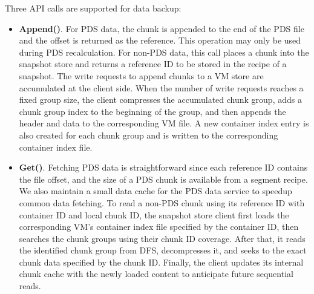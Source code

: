 Three API calls are supported for data backup:
\begin{itemize}

\item
\noindent\textbf{Append()}. 
For PDS data, the chunk is appended to the end of the PDS file and the offset is returned as the  reference.
This operation  may only be used during PDS recalculation.
For non-PDS data, this call places a chunk into 
the snapshot store and returns a reference ID to be stored in the recipe of a snapshot. 
The write requests to append chunks to a VM store are accumulated at the client side. 
When the number of write requests reaches a fixed group size, the client compresses
the accumulated   chunk group, adds a chunk group index  to the beginning of the group, and then
appends the header and data  to the corresponding VM file.
A new container  index entry is also created for each chunk group and is written to the corresponding
container index file.

\item
\noindent\textbf{Get()}.
Fetching PDS data is straightforward since each reference ID contains 
the file offset, and the size of a PDS chunk is available from a segment recipe.
We also maintain a small data cache for the PDS data service to speedup common data fetching.
To read a non-PDS chunk using its reference ID with container ID and local chunk ID,  the snapshot store client 
first loads the
corresponding VM's container index file specified by the container ID, then searches the chunk
groups  using their  chunk ID coverage.
After that, it reads the identified chunk group from DFS, decompresses it, and seeks to the exact chunk data 
specified by the chunk ID. 
Finally, the client updates its internal chunk cache with the newly loaded content to 
anticipate future sequential reads.


\end{itemize}
